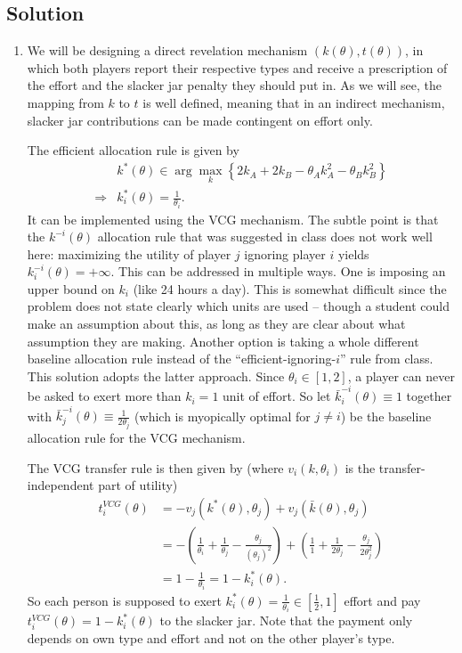 \documentclass[a4paper]{article}
\newif\ifsolutions
\begin{document}
\ifsolutions
\subsection*{Solution}
\begin{enumerate}
	\item We will be designing a direct revelation mechanism $(k(\theta),t(\theta))$, in which both players report their respective types and receive a prescription of the effort and the slacker jar penalty they should put in. As we will see, the mapping from $k$ to $t$ is well defined, meaning that in an indirect mechanism, slacker jar contributions can be made contingent on effort only.
	
	The efficient allocation rule is given by
	\begin{align*}
		&k^*(\theta) \in \arg \max_k \left\{ 2k_A + 2k_B - \theta_A k_A^2 - \theta_B k_B^2 \right\}
		\\
		\Rightarrow
		&k_i^*(\theta) = \frac{1}{\theta_i}.
	\end{align*}
	It can be implemented using the VCG mechanism. The subtle point is that the $k^{-i}(\theta)$ allocation rule that was suggested in class does not work well here: maximizing the utility of player $j$ ignoring player $i$ yields $k^{-i}_i(\theta) = +\infty$. This can be addressed in multiple ways. One is imposing an upper bound on $k_i$ (like 24 hours a day). This is somewhat difficult since the problem does not state clearly which units are used -- though a student could make an assumption about this, as long as they are clear about what assumption they are making. Another option is taking a whole different baseline allocation rule instead of the ``efficient-ignoring-$i$'' rule from class. This solution adopts the latter approach. Since $\theta_i \in [1,2]$, a player can never be asked to exert more than $k_i = 1$ unit of effort. So let $\bar{k}_i^{-i}(\theta) \equiv 1$ together with $\bar{k}_j^{-i}(\theta) \equiv \frac{1}{2\theta_j}$ (which is myopically optimal for $j \neq i$) be the baseline allocation rule for the VCG mechanism.
	
	The VCG transfer rule is then given by (where $v_i(k,\theta_i)$ is the transfer-independent part of utility)
	\begin{align*}
		t_i^{VCG}(\theta) &= - v_j(k^*(\theta),\theta_j) + v_j(\bar{k}(\theta), \theta_j)
		\\
		&= - \left( \frac{1}{\theta_i} + \frac{1}{\theta_j} - \frac{\theta_j}{(\theta_j)^2} \right) + \left( \frac{1}{1} + \frac{1}{2 \theta_j} - \frac{\theta_j}{2\theta_j^2} \right)
		\\
		&= 1-\frac{1}{\theta_i} = 1-k^*_i(\theta).
	\end{align*}
	So each person is supposed to exert $k_i^*(\theta) = \frac{1}{\theta_i} \in \left[ \frac{1}{2}, 1 \right]$ effort and pay $t_i^{VCG}(\theta) = 1-k^*_i(\theta)$ to the slacker jar. Note that the payment only depends on own type and effort and not on the other player's type. 
	

\end{enumerate}
\end{document}

